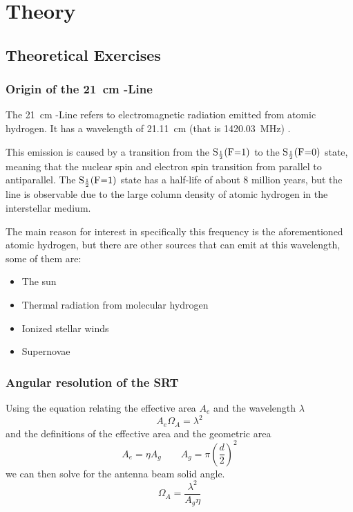 \section{Theory}
\subsection{Theoretical Exercises}
\subsubsection[Origin of the 21 cm HI-Line]{Origin of the \SI{21}{cm} -Line}
The \SI{21}{cm} -Line refers to electromagnetic radiation emitted from atomic hydrogen. It has a wavelength of \SI{21.11}{cm} (that is \SI{1420.03}{\mega\hertz}) \cite[Ch 3.1]{srt}.

This emission is caused by a transition from the $\ce{S_{\frac{1}{2}}(F=1)}$ to the $\ce{S_{\frac{1}{2}}(F=0)}$ state, meaning that the nuclear spin and electron spin transition from parallel to antiparallel.
The $\ce{S_{\frac{1}{2}}(F=1)}$ state has a half-life of about 8 million years, but the line is observable due to the large column density of atomic hydrogen in the interstellar medium. \cite[Ch. 13.1]{wilson_tools_2009}

The main reason for interest in specifically this frequency is the aforementioned atomic hydrogen, but there are other sources that can emit at this wavelength, some of them are: \cite[11.1-11.4]{wilson_tools_2009}
\begin{itemize}
    \item The sun
    \item Thermal radiation from molecular hydrogen
    \item Ionized stellar winds
    \item Supernovae
\end{itemize}
\subsubsection{Angular resolution of the SRT}\label{sec:ang_res}
Using the equation relating the effective area $A_e$ and the wavelength $\lambda$ \cite[p. 149]{wilson_tools_2009}
\begin{equation}
    A_e \Omega_A = \lambda^2
\end{equation}
and the definitions of the effective area and the geometric area \cite[p. 148]{wilson_tools_2009}
\begin{equation}
    A_e = \eta A_g \qquad A_g = \pi \left( \frac{d}{2} \right)^2 \label{eq:A_e}
\end{equation}
we can then solve for the antenna beam solid angle.
\begin{equation}
    \Omega_A = \frac{\lambda^2}{A_g \eta} \label{eq:Omega_A}
\end{equation}


